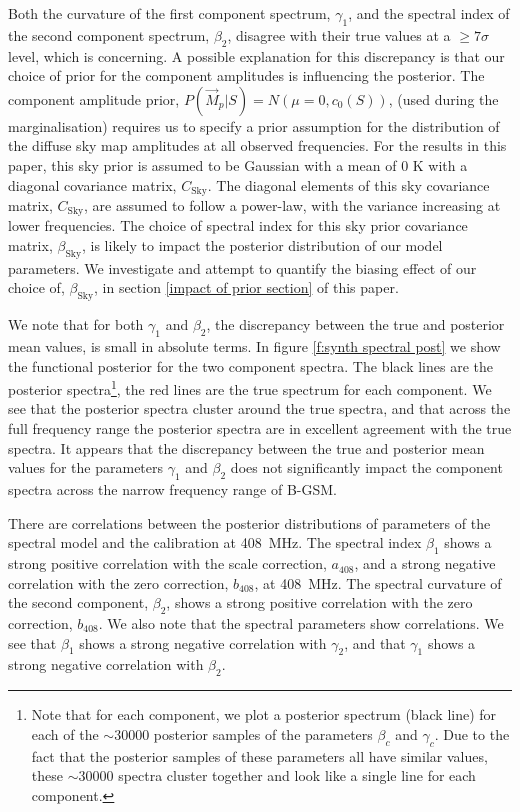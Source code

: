 \documentclass[fleqn,usenatbib]{mnras}
\begin{document}
Both the curvature of the first component spectrum, $\gamma_1$, and the spectral index of the second component spectrum, $\beta_2$, disagree with their true values at a $\geq7\sigma$ level, which is concerning. A possible explanation for this discrepancy is that our choice of prior for the component amplitudes is influencing the posterior. The component amplitude prior, $P(\vec{M}_p|S)=N(\mu=0,c_0(S))$, (used during the marginalisation) requires us to specify a prior assumption for the distribution of the diffuse sky map amplitudes at all observed frequencies. For the results in this paper, this sky prior is assumed to be Gaussian with a mean of 0 K with a diagonal covariance matrix, $C_\mathrm{Sky}$. The diagonal elements of this sky covariance matrix, $C_\mathrm{Sky}$, are assumed to follow a power-law, with the variance increasing at lower frequencies. The choice of spectral index for this sky prior covariance matrix, $\beta_\mathrm{Sky}$, is likely to impact the posterior distribution of our model parameters. We investigate and attempt to quantify the biasing effect of our choice of, $\beta_\mathrm{Sky}$, in section \ref{impact of prior section} of this paper.  

We note that for both $\gamma_1$ and $\beta_2$, the discrepancy between the true and posterior mean values, is small in absolute terms. In figure \ref{f:synth spectral post} we show the functional posterior for the two component spectra. The black lines are the posterior spectra\footnote{Note that for each component, we plot a posterior spectrum (black line) for each of the $\sim30000$ posterior samples of the parameters $\beta_c$ and $\gamma_c$. Due to the fact that the posterior samples of these parameters all have similar values, these $\sim 30000$ spectra cluster together and look like a single line for each component.}, the red lines are the true spectrum for each component. We see that the posterior spectra cluster around the true spectra, and that across the full frequency range the posterior spectra are in excellent agreement with the true spectra. It appears that the discrepancy between the true and posterior mean values for the parameters $\gamma_1$ and $\beta_2$ does not significantly impact the component spectra across the narrow frequency range of B-GSM. 

There are correlations between the posterior distributions of parameters of the spectral model and the calibration at 408~MHz. The spectral index $\beta_1$ shows a strong positive correlation with the scale correction, $a_{408}$, and a strong negative correlation with the zero correction, $b_{408}$, at 408~MHz. The spectral curvature of the second component, $\beta_2$, shows a strong positive correlation with the zero correction, $b_{408}$. We also note that the spectral parameters show correlations. We see that $\beta_1$ shows a strong negative correlation with $\gamma_2$, and that $\gamma_1$ shows a strong negative correlation with $\beta_2$. 
\end{document}
